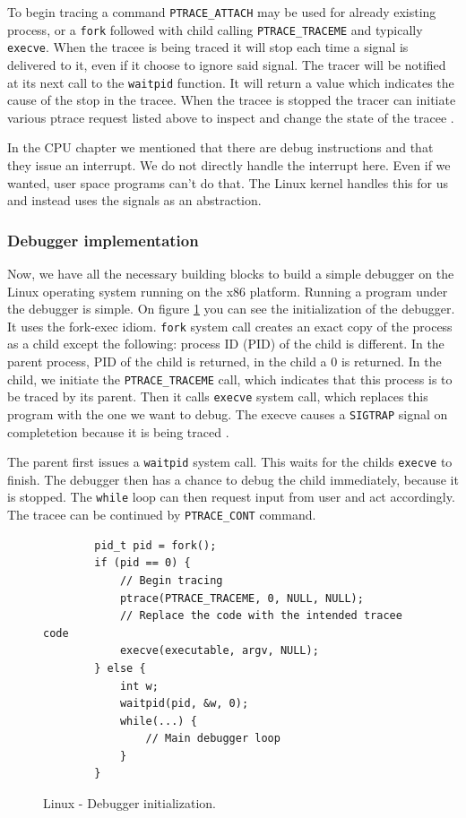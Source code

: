 To begin tracing a command \texttt{PTRACE\_ATTACH} may be used for already
existing process, or a \texttt{fork} followed with child calling
\texttt{PTRACE\_TRACEME} and typically \texttt{execve}. When the tracee is
being traced it will stop each time a signal is delivered to it, even if it
choose to ignore said signal. The tracer will be notified at its next call to
the \texttt{waitpid} function. It will return a value which indicates the cause
of the stop in the tracee. When the tracee is stopped the tracer can initiate
various ptrace request listed above to inspect and change the state of the
tracee \cite{ptrace}.

In the CPU chapter we mentioned that there are debug instructions and that they
issue an interrupt. We do not directly handle the interrupt here. Even if we
wanted, user space programs can't do that. The Linux kernel handles this for us
and instead uses the signals as an abstraction. 

\subsubsection{Debugger implementation}
Now, we have all the necessary building blocks to build a simple debugger on
the Linux operating system running on the x86 platform. Running a program under
the debugger is simple. On figure \ref{fig:debugger-init} you can see the
initialization of the debugger. It uses the fork-exec idiom. \texttt{fork}
system call creates an exact copy of the process as a child except the
following: process ID (PID) of the child is different. In the parent process,
PID of the child is returned, in the child a $0$ is returned. In the child, we
initiate the \texttt{PTRACE\_TRACEME} call, which indicates that this process
is to be traced by its parent. Then it calls \texttt{execve} system call, which
replaces this program with the one we want to debug. The execve causes a
\texttt{SIGTRAP} signal on completetion because it is being traced
\cite{execve}.

The parent first issues a \texttt{waitpid} system call. This waits for the
childs \texttt{execve} to finish. The debugger then has a chance to debug the
child immediately, because it is stopped. The \texttt{while} loop can then
request input from user and act accordingly. The tracee can be continued by
\texttt{PTRACE\_CONT} command.

\begin{figure}\label{fig:debugger-init}
    \begin{verbatim}
        pid_t pid = fork();
        if (pid == 0) {
            // Begin tracing
            ptrace(PTRACE_TRACEME, 0, NULL, NULL);
            // Replace the code with the intended tracee code
            execve(executable, argv, NULL);
        } else {
            int w;
            waitpid(pid, &w, 0);
            while(...) {
                // Main debugger loop
            }
        }
    \end{verbatim}
    \caption{Linux - Debugger initialization.}
\end{figure}

